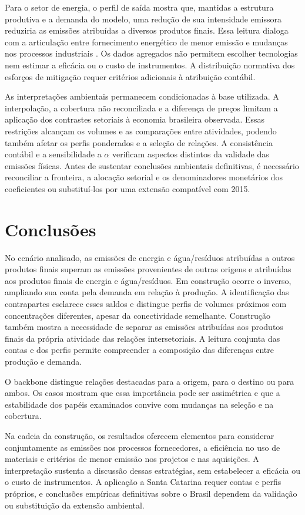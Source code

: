 \documentclass[11pt]{article}
\begin{document}
Para o setor de energia, o perfil de saída mostra que, mantidas a estrutura produtiva e a demanda do modelo, uma redução de sua intensidade emissora reduziria as emissões atribuídas a diversos produtos finais. Essa leitura dialoga com a articulação entre fornecimento energético de menor emissão e mudanças nos processos industriais \parencite[seções~4.2 e~7.2]{rissman2020}. Os dados agregados não permitem escolher tecnologias nem estimar a eficácia ou o custo de instrumentos. A distribuição normativa dos esforços de mitigação requer critérios adicionais à atribuição contábil.

As interpretações ambientais permanecem condicionadas à base utilizada. A interpolação, a cobertura não reconciliada e a diferença de preços limitam a aplicação dos contrastes setoriais à economia brasileira observada. Essas restrições alcançam os volumes e as comparações entre atividades, podendo também afetar os perfis ponderados e a seleção de relações. A consistência contábil e a sensibilidade a $\alpha$ verificam aspectos distintos da validade das emissões físicas. Antes de sustentar conclusões ambientais definitivas, é necessário reconciliar a fronteira, a alocação setorial e os denominadores monetários dos coeficientes ou substituí-los por uma extensão compatível com 2015.

\clearpage
\section{Conclusões}

No cenário analisado, as emissões de energia e água/resíduos atribuídas a outros produtos finais superam as emissões provenientes de outras origens e atribuídas aos produtos finais de energia e água/resíduos. Em construção ocorre o inverso, ampliando sua conta pela demanda em relação à produção. A identificação das contrapartes esclarece esses saldos e distingue perfis de volumes próximos com concentrações diferentes, apesar da conectividade semelhante. Construção também mostra a necessidade de separar as emissões atribuídas aos produtos finais da própria atividade das relações intersetoriais. A leitura conjunta das contas e dos perfis permite compreender a composição das diferenças entre produção e demanda.

O backbone distingue relações destacadas para a origem, para o destino ou para ambos. Os casos mostram que essa importância pode ser assimétrica e que a estabilidade dos papéis examinados convive com mudanças na seleção e na cobertura.

Na cadeia da construção, os resultados oferecem elementos para considerar conjuntamente as emissões nos processos fornecedores, a eficiência no uso de materiais e critérios de menor emissão nos projetos e nas aquisições. A interpretação sustenta a discussão dessas estratégias, sem estabelecer a eficácia ou o custo de instrumentos. A aplicação a Santa Catarina requer contas e perfis próprios, e conclusões empíricas definitivas sobre o Brasil dependem da validação ou substituição da extensão ambiental.

\clearpage
\begingroup
{}
\raggedright
\printbibliography[title={Referências}]
\endgroup

\end{document}
